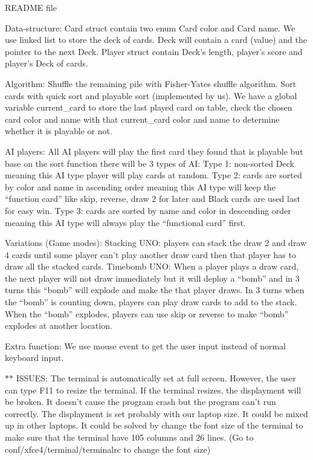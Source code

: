 R\+E\+A\+D\+M\+E file

Data-\/structure\+: Card struct contain two enum Card color and Card name. We use linked list to store the deck of cards. Deck will contain a card (value) and the pointer to the next Deck. Player struct contain Deck’s length, player’s score and player’s Deck of cards.

Algorithm\+: Shuffle the remaining pile with Fisher-\/\+Yates shuffle algorithm. Sort cards with quick sort and playable sort (implemented by us). We have a global variable current\+\_\+card to store the last played card on table, check the chosen card color and name with that current\+\_\+card color and name to determine whether it is playable or not.

A\+I players\+: All A\+I players will play the first card they found that is playable but base on the sort function there will be 3 types of A\+I\+: Type 1\+: non-\/sorted Deck meaning this A\+I type player will play cards at random. Type 2\+: cards are sorted by color and name in ascending order meaning this A\+I type will keep the “function card” like skip, reverse, draw 2 for later and Black cards are used last for easy win. Type 3\+: cards are sorted by name and color in descending order meaning this A\+I type will always play the “functional card” first.

Variations (Game modes)\+: Stacking U\+N\+O\+: players can stack the draw 2 and draw 4 cards until some player can’t play another draw card then that player has to draw all the stacked cards. Timebomb U\+N\+O\+: When a player plays a draw card, the next player will not draw immediately but it will deploy a “bomb” and in 3 turns this “bomb” will explode and make the that player draws. In 3 turns when the “bomb” is counting down, players can play draw cards to add to the stack. When the “bomb” explodes, players can use skip or reverse to make “bomb” explodes at another location.

Extra function\+: We use mouse event to get the user input instead of normal keyboard input.

$\ast$$\ast$ I\+S\+S\+U\+E\+S\+: The terminal is automatically set at full screen. However, the user can type F11 to resize the terminal. If the terminal resizes, the displayment will be broken. It doesn’t cause the program crash but the program can’t run correctly. The displayment is set probably with our laptop size. It could be mixed up in other laptops. It could be solved by change the font size of the terminal to make sure that the terminal have 105 columns and 26 lines. (Go to conf/xfce4/terminal/terminalrc to change the font size) 